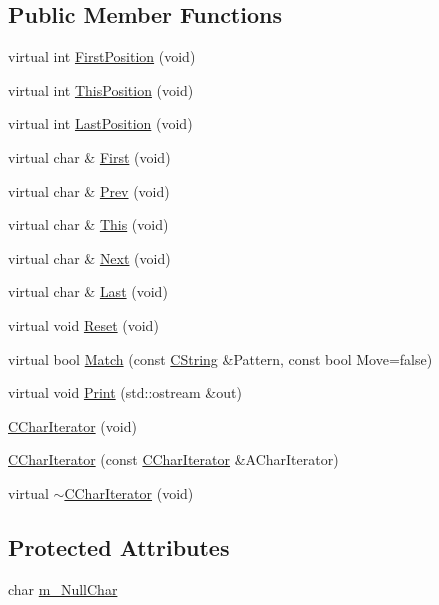 \subsection*{Public Member Functions}
\begin{DoxyCompactItemize}
\item 
virtual int \hyperlink{classCCharIterator_af76726073a2c137b42031206da3fd077}{First\-Position} (void)
\item 
virtual int \hyperlink{classCCharIterator_a0bb27af4d399d1104a0ac630dad15551}{This\-Position} (void)
\item 
virtual int \hyperlink{classCCharIterator_a8c8c9299de7a6f743f038a8eff713331}{Last\-Position} (void)
\item 
virtual char \& \hyperlink{classCCharIterator_abc3cf59a2d2e08cf9dc472fc3586fe1d}{First} (void)
\item 
virtual char \& \hyperlink{classCCharIterator_a84808ea6da1bff06b9528068c3b67eb6}{Prev} (void)
\item 
virtual char \& \hyperlink{classCCharIterator_ab7ccc7e2891c3cd4ed9b08aef30f1a17}{This} (void)
\item 
virtual char \& \hyperlink{classCCharIterator_aa432eb048079b39a13d6147d8d977a0d}{Next} (void)
\item 
virtual char \& \hyperlink{classCCharIterator_a41a44b4c83aca6b35dd1ebd6d27e4fbb}{Last} (void)
\item 
virtual void \hyperlink{classCCharIterator_ac72db043fb84594bddf6fade20b906de}{Reset} (void)
\item 
virtual bool \hyperlink{classCCharIterator_a41cb29bdf53b99947a8f2a8c7894c7fe}{Match} (const \hyperlink{classCString}{C\-String} \&Pattern, const bool Move=false)
\item 
virtual void \hyperlink{classCCharIterator_a84ddcc0e6e24b12dd4883b11a1da48e2}{Print} (std\-::ostream \&out)
\item 
\hyperlink{classCCharIterator_a4e9b0b7376aafd366196a73d16d09c85}{C\-Char\-Iterator} (void)
\item 
\hyperlink{classCCharIterator_a4057437a5927e30014fc901cc6f11edd}{C\-Char\-Iterator} (const \hyperlink{classCCharIterator}{C\-Char\-Iterator} \&A\-Char\-Iterator)
\item 
virtual \hyperlink{classCCharIterator_a9cc988eac3b692b0451faba730ffa9b4}{$\sim$\-C\-Char\-Iterator} (void)
\end{DoxyCompactItemize}
\subsection*{Protected Attributes}
\begin{DoxyCompactItemize}
\item 
char \hyperlink{classCCharIterator_ae7690621a79350973df240ef49f579cc}{m\-\_\-\-Null\-Char}
\end{DoxyCompactItemize}


